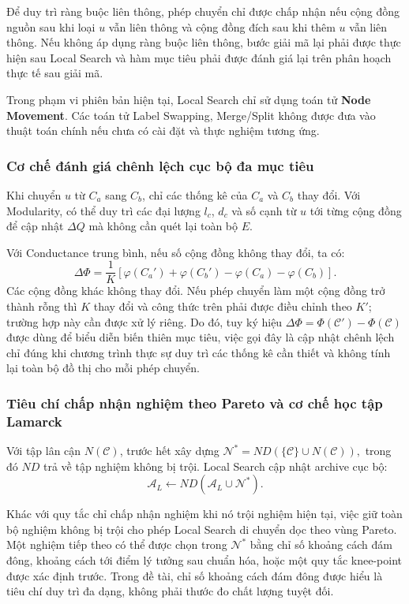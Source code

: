 \documentclass[14pt,a4paper]{extarticle}
\begin{document}
Để duy trì ràng buộc liên thông, phép chuyển chỉ được chấp nhận nếu cộng đồng nguồn sau khi loại $u$ vẫn liên thông và cộng đồng đích sau khi thêm $u$ vẫn liên thông. Nếu không áp dụng ràng buộc liên thông, bước giải mã lại phải được thực hiện sau Local Search và hàm mục tiêu phải được đánh giá lại trên phân hoạch thực tế sau giải mã.

Trong phạm vi phiên bản hiện tại, Local Search chỉ sử dụng toán tử \textbf{Node Movement}. Các toán tử Label Swapping, Merge/Split không được đưa vào thuật toán chính nếu chưa có cài đặt và thực nghiệm tương ứng.

\subsubsection{Cơ chế đánh giá chênh lệch cục bộ đa mục tiêu}

Khi chuyển $u$ từ $C_a$ sang $C_b$, chỉ các thống kê của $C_a$ và $C_b$ thay đổi. Với Modularity, có thể duy trì các đại lượng $l_c$, $d_c$ và số cạnh từ $u$ tới từng cộng đồng để cập nhật $\Delta Q$ mà không cần quét lại toàn bộ $E$.

Với Conductance trung bình, nếu số cộng đồng không thay đổi, ta có:
\[
\Delta\Phi
=
\frac{1}{K}
\left[
\varphi(C_a')+\varphi(C_b')
-\varphi(C_a)-\varphi(C_b)
\right].
\]
Các cộng đồng khác không thay đổi. Nếu phép chuyển làm một cộng đồng trở thành rỗng thì $K$ thay đổi và công thức trên phải được điều chỉnh theo $K'$; trường hợp này cần được xử lý riêng.
Do đó, tuy ký hiệu $\Delta\Phi=\Phi(\mathcal{C}')-\Phi(\mathcal{C})$ được dùng để biểu diễn biến thiên mục tiêu, việc gọi đây là cập nhật chênh lệch chỉ đúng khi chương trình thực sự duy trì các thống kê cần thiết và không tính lại toàn bộ đồ thị cho mỗi phép chuyển.

\subsubsection{Tiêu chí chấp nhận nghiệm theo Pareto và cơ chế học tập Lamarck}

Với tập lân cận $N(\mathcal{C})$, trước hết xây dựng
$
\mathcal{N}^{*}
=
ND\left(\{\mathcal{C}\}\cup N(\mathcal{C})\right),
$ trong đó $ND$ trả về tập nghiệm không bị trội. Local Search cập nhật archive cục bộ:
\[
\mathcal{A}_L
\leftarrow
ND\left(\mathcal{A}_L\cup\mathcal{N}^{*}\right).
\]

Khác với quy tắc chỉ chấp nhận nghiệm khi nó trội nghiệm hiện tại, việc giữ toàn bộ nghiệm không bị trội cho phép Local Search di chuyển dọc theo vùng Pareto. Một nghiệm tiếp theo có thể được chọn trong $\mathcal{N}^{*}$ bằng chỉ số khoảng cách đám đông, khoảng cách tới điểm lý tưởng sau chuẩn hóa, hoặc một quy tắc knee-point được xác định trước. Trong đề tài, chỉ số khoảng cách đám đông được hiểu là tiêu chí duy trì đa dạng, không phải thước đo chất lượng tuyệt đối.
\end{document}

